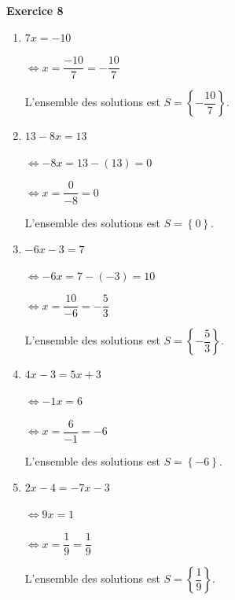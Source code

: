 \documentclass[12pt,a4paper,french]{article}
\begin{document}
\noindent\textbf{Exercice 8}\par
\smallskip
\begin{enumerate}
\item $7x = -10$

$\Leftrightarrow x = \dfrac{-10}{7} = - \dfrac{10}{7}$

L'ensemble des solutions est $S = \left\{- \dfrac{10}{7}\right\}$.

\item $13 - 8x = 13$

$\Leftrightarrow -8x = 13 - (13) = 0$

$\Leftrightarrow x = \dfrac{0}{-8} = 0$

L'ensemble des solutions est $S = \left\{0\right\}$.

\item $-6x - 3 = 7$

$\Leftrightarrow -6x = 7 - (-3) = 10$

$\Leftrightarrow x = \dfrac{10}{-6} = - \dfrac{5}{3}$

L'ensemble des solutions est $S = \left\{- \dfrac{5}{3}\right\}$.

\item $4x - 3 = 5x + 3$

$\Leftrightarrow -1x = 6$

$\Leftrightarrow x = \dfrac{6}{-1} = -6$

L'ensemble des solutions est $S = \left\{-6\right\}$.

\item $2x - 4 = -7x - 3$

$\Leftrightarrow 9x = 1$

$\Leftrightarrow x = \dfrac{1}{9} = \dfrac{1}{9}$

L'ensemble des solutions est $S = \left\{\dfrac{1}{9}\right\}$.

\end{enumerate}
\medskip
\end{document}
